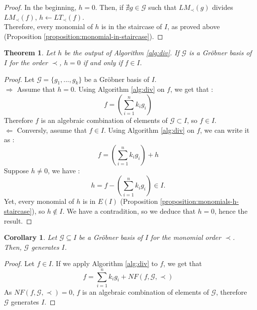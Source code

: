 \documentclass{article}
\newtheorem{theorem}{Theorem}[section]
\newtheorem{corollary}{Corollary}[theorem]
\begin{document}
\begin{proof}
    In the beginning, $h = 0$. Then, if $\nexists g \in \mathscr{G}$ such that $LM_{\prec}(g)$ divides $LM_{\prec}(f)$, $h \gets LT_{\prec}(f)$. \\
    Therefore, every monomial of $h$ is in the staircase of $I$, as proved above (Proposition \ref{proposition:monomial-in-staircase}). 
\end{proof}

\begin{theorem}
    Let $h$ be the output of Algorithm \ref{alg:div}. If $\mathscr{G}$ is a Gröbner basis of $I$ for the order $\prec$, $h = 0$ if and only if $f \in I$.
\end{theorem}

\begin{proof}
    Let $\mathscr{G} = \{g_{1}, ..., g_{k}\}$ be a Gröbner basis of $I$. \\
    $\Rightarrow$ Assume that $h = 0$. Using Algorithm \ref{alg:div} on $f$, we get that : 
    \begin{displaymath}
        f = \left( \sum_{i = 1}^{n} k_{i}g_{i} \right)
    \end{displaymath}
    Therefore $f$ is an algebraic combination of elements of $\mathscr{G} \subset I$, so $f \in I$. \\
    $\Leftarrow$ Conversly, assume that $f \in I$. Using Algorithm \ref{alg:div} on $f$, we can write it as :
    \begin{displaymath}
        f = \left( \sum_{i = 1}^{n} k_{i}g_{i} \right) + h
    \end{displaymath}
    Suppose $h \neq 0$, we have : 
    \begin{displaymath}
        h = f - \left( \sum_{i = 1}^{n} k_{i}g_{i} \right) \in I. 
    \end{displaymath}
    Yet, every monomial of $h$ is in $E(I)$ (Proposition \ref{proposition:monomials-h-staircase}), so $h \notin I$. We have a contradition, so we deduce that $h = 0$, hence the result.
\end{proof}

\begin{corollary} \label{corollary:g-generates-i}
    Let $\mathscr{G} \subseteq I$ be a Gröbner basis of $I$ for the monomial order $\prec$. Then, $\mathscr{G}$ generates $I$.
\end{corollary}

\begin{proof}
    Let $f \in I$. If we apply Algorithm \ref{alg:div} to $f$, we get that 
    \begin{displaymath}
        f = \sum_{i = 1}^{n} k_{i}g_{i} + NF(f, \mathscr{G}, \prec)
    \end{displaymath}
    As $NF(f, \mathscr{G}, \prec) = 0$, $f$ is an algebraic combination of elements of $\mathscr{G}$, therefore $\mathscr{G}$ generates $I$.
\end{proof}
\end{document}

